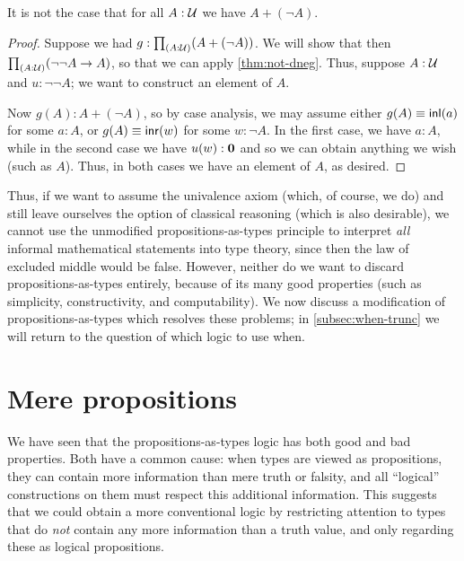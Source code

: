 \begin{cor}\label{thm:not-lem}
  It is not the case that for all $A:\mathcal{U}$ we have $A+(\neg A)$.
\end{cor}
\begin{proof}
  Suppose we had $g:\prd{A:\UU} (A+(\neg A))$.
  We will show that then $\prd{A:\UU} (\neg\neg A \to A)$, so that we can apply \cref{thm:not-dneg}.
  Thus, suppose $A:\mathcal{U}$ and $u:\neg\neg A$; we want to construct an element of $A$.

  Now $g(A):A+(\neg A)$, so by case analysis, we may assume either $g(A)\equiv {\mathsf{inl}}(a)$ for some $a:A$, or $g(A)\equiv {\mathsf{inr}}(w)$ for some $w:\neg A$.
  In the first case, we have $a:A$, while in the second case we have $u(w):\mathbf{0}$ and so we can obtain anything we wish (such as $A$).
  Thus, in both cases we have an element of $A$, as desired.
\end{proof}

Thus, if we want to assume the univalence axiom (which, of course, we do) and still leave ourselves the option of classical reasoning (which is also desirable), we cannot use the unmodified propositions-as-types principle to interpret \emph{all} informal mathematical statements into type theory, since then the law of excluded middle would be false.
However, neither do we want to discard propositions-as-types entirely, because of its many good properties (such as simplicity, constructivity, and computability).
We now discuss a modification of propositions-as-types which resolves these problems; in \cref{subsec:when-trunc} we will return to the question of which logic to use when.
%
%
%

\section{Mere propositions}
\label{subsec:hprops}

%
%
%
We have seen that the propositions-as-types logic has both good and bad properties.
Both have a common cause: when types are viewed as propositions, they can contain more information than mere truth or falsity, and all ``logical'' constructions on them must respect this additional information.
This suggests that we could obtain a more conventional logic by restricting attention to types that do \emph{not} contain any more information than a truth value, and only regarding these as logical propositions.

